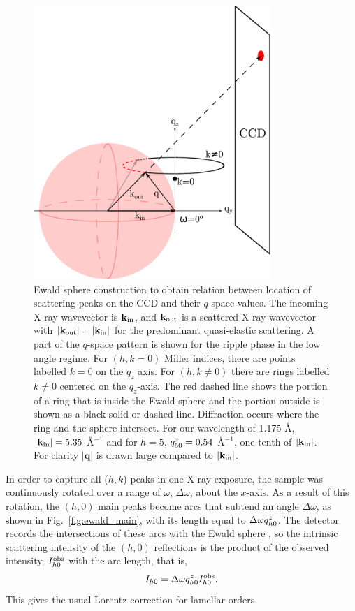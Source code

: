 \begin{figure}[htbp]
  \centering
  \includegraphics[width=0.8\textwidth]{figures/ripple/analysis/ripple_sample_qspace}
  \caption{Ewald sphere construction to obtain relation between location of 
  scattering peaks on the CCD and their $q$-space values. The incoming X-ray 
  wavevector is $\mathbf{k}_{\mathrm{in}}$, and $\mathbf{k}_{\mathrm{out}}$ is a scattered X-ray wavevector with 
  $|\mathbf{k}_{\mathrm{out}}|=|\mathbf{k}_{\mathrm{in}}|$ for the predominant quasi-elastic scattering. 
  A part of the $q$-space pattern is shown for the ripple phase in the low angle 
  regime. For $(h, k=0)$ Miller indices, there are points labelled $k=0$ on the 
  $q_z$ axis.  
  For $(h,k\neq0)$ there are rings labelled $k\neq0$ centered on the 
  $q_z$-axis. The red dashed line shows the portion of a ring that is inside 
  the Ewald sphere and the portion outside is shown as a black solid 
  or dashed line. 
  Diffraction occurs where the ring and the sphere intersect. For our wavelength
	of 1.175 \AA, $|\mathbf{k}_{\mathrm{in}}|=5.35$ \AA$^{-1}$ and for $h=5$,
  $q_{50}^z=0.54$ \AA$^{-1}$, one tenth of $|\mathbf{k}_{\mathrm{in}}|$.
  For clarity $|\mathbf{q}|$ is drawn large compared to $|\mathbf{k}_{\mathrm{in}}|$. 
  }
  \label{fig:ripple_sample_qspace}
\end{figure}

In order to capture all ($h, k$) peaks in one X-ray exposure, 
the sample was continuously rotated over a range of $\omega$, $\Delta\omega$,
about the $x$-axis. As a result of this rotation, 
the $(h, 0)$ main peaks become arcs that subtend an angle $\Delta\omega$,
as shown in Fig.~\ref{fig:ewald_main}, with its length
equal to $\Delta\omega q_{h0}^z$. 
The detector records the intersections of these arcs with the 
Ewald sphere \cite{ref:Warren69}, 
so the intrinsic scattering intensity of the $(h, 0)$ reflections
is the product of the observed intensity, $I_{h0}^\textrm{obs}$ with the arc length, that is, 
\begin{equation}
  I_{h0} = \Delta\omega q_{h0}^z I_{h0}^\textrm{obs}. \label{eq:main_ewald}
\end{equation}
This gives the usual Lorentz correction for lamellar orders.

